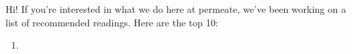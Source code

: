 Hi! If you're interested in what we do here at permeate, we've been working on a list of recommended readings. Here are the top 10:

\begin{enumerate}
	\item {}
\end{enumerate}

